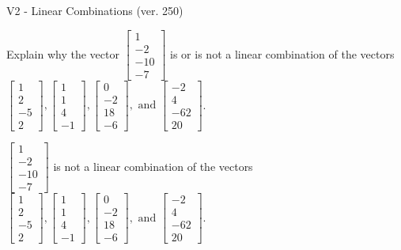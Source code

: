 \begin{exercise}
  \begin{exerciseTitle}V2 - Linear Combinations (ver. 250)\end{exerciseTitle}
  \begin{exerciseStatement}
    Explain why the vector \(\left[\begin{array}{c}
1 \\
-2 \\
-10 \\
-7
\end{array}\right]\)  is or is not a linear 
	combination of the vectors \(\left[\begin{array}{c}
1 \\
2 \\
-5 \\
2
\end{array}\right] , \left[\begin{array}{c}
1 \\
1 \\
4 \\
-1
\end{array}\right] , \left[\begin{array}{c}
0 \\
-2 \\
18 \\
-6
\end{array}\right] , \text{ and } \left[\begin{array}{c}
-2 \\
4 \\
-62 \\
20
\end{array}\right]\).
	


  \end{exerciseStatement}
  \begin{exerciseAnswer}
   \(\left[\begin{array}{c}
1 \\
-2 \\
-10 \\
-7
\end{array}\right]\) 
  	 is not  
	a linear combination of the vectors \(\left[\begin{array}{c}
1 \\
2 \\
-5 \\
2
\end{array}\right] , \left[\begin{array}{c}
1 \\
1 \\
4 \\
-1
\end{array}\right] , \left[\begin{array}{c}
0 \\
-2 \\
18 \\
-6
\end{array}\right] , \text{ and } \left[\begin{array}{c}
-2 \\
4 \\
-62 \\
20
\end{array}\right]\).


\end{exerciseAnswer}
\end{exercise}
